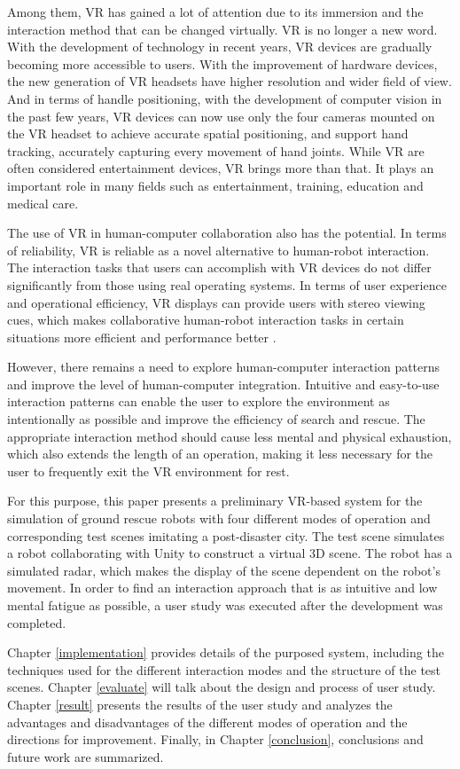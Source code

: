 Among them, VR has gained a lot of attention due to its immersion and the interaction method that can be changed virtually. VR is no longer a new word. With the development of technology in recent years, VR devices are gradually becoming more accessible to users. With the improvement of hardware devices, the new generation of VR headsets have higher resolution and wider field of view. And in terms of handle positioning, with the development of computer vision in the past few years, VR devices can now use only the four cameras mounted on the VR headset to achieve accurate spatial positioning, and support hand tracking, accurately capturing every movement of hand joints. While VR are often considered entertainment devices, VR brings more than that. It plays an important role in many fields such as entertainment, training, education and medical care.

The use of VR in human-computer collaboration also has the potential. In terms of reliability, VR is reliable as a novel alternative to human-robot interaction. The interaction tasks that users can accomplish with VR devices do not differ significantly from those using real operating systems\cite{Villani:2018ub}. In terms of user experience and operational efficiency, VR displays can provide users with stereo viewing cues, which makes collaborative human-robot interaction tasks in certain situations more efficient and performance better \cite{Liu:2017tw}.

However, there remains a need to explore human-computer interaction patterns and improve the level of human-computer integration\cite{Wang:2017uy}. Intuitive and easy-to-use interaction patterns can enable the user to explore the environment as intentionally as possible and improve the efficiency of search and rescue. The appropriate interaction method should cause less mental and physical exhaustion, which also extends the length of an operation, making it less necessary for the user to frequently exit the VR environment for rest.

For this purpose, this paper presents a preliminary VR-based system for the simulation of ground rescue robots with four different modes of operation and corresponding test scenes imitating a post-disaster city. The test scene simulates a robot collaborating with Unity to construct a virtual 3D scene. The robot has a simulated radar, which makes the display of the scene dependent on the robot's movement.
In order to find an interaction approach that is as intuitive and low mental fatigue as possible, a user study was executed after the development was completed.



Chapter \ref{implementation} provides details of the purposed system, including the techniques used for the different interaction modes and the structure of the test scenes.
Chapter \ref{evaluate} will talk about the design and process of user study.
Chapter \ref{result} presents the results of the user study and analyzes the advantages and disadvantages of the different modes of operation and the directions for improvement.
Finally, in Chapter \ref{conclusion}, conclusions and future work are summarized.


